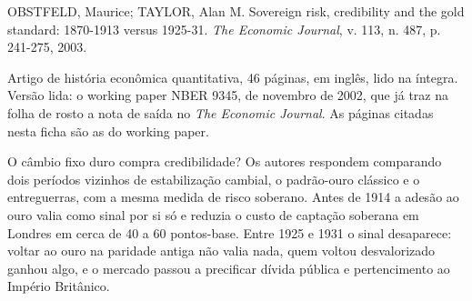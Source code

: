 
\begin{identificacao}
OBSTFELD, Maurice; TAYLOR, Alan M. Sovereign risk, credibility and the gold
standard: 1870-1913 versus 1925-31. \textit{The Economic Journal}, v. 113,
n. 487, p. 241-275, 2003.

Artigo de história econômica quantitativa, 46 páginas, em inglês, lido na
íntegra. Versão lida: o working paper NBER 9345, de novembro de 2002, que já
traz na folha de rosto a nota de saída no \textit{The Economic Journal}. As
páginas citadas nesta ficha são as do working paper.
\end{identificacao}


O câmbio fixo duro compra credibilidade? Os autores respondem comparando dois
períodos vizinhos de estabilização cambial, o padrão-ouro clássico e o
entreguerras, com a mesma medida de risco soberano. Antes de 1914 a adesão ao
ouro valia como sinal por si só e reduzia o custo de captação soberana em
Londres em cerca de 40 a 60 pontos-base. Entre 1925 e 1931 o sinal desaparece:
voltar ao ouro na paridade antiga não valia nada, quem voltou desvalorizado
ganhou algo, e o mercado passou a precificar dívida pública e pertencimento ao
Império Britânico.



